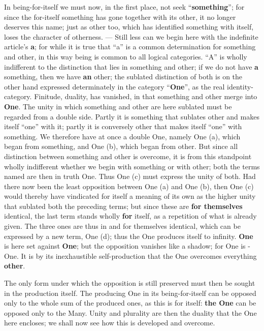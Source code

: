 \documentclass[12pt,a4paper,openany]{book}
\newcommand{\opage}[1]{\marginnote{\footnotesize\textit{[#1]}}}
\begin{document}
In being-for-itself we must now, in the first place, not
seek ``\textbf{something}''; for since the for-itself something
\setcounter{footnote}{0}%
\opage{16}has gone together with its other, it no longer deserves
this name; just as other too, which has
identified something with itself, loses the character of otherness.
--- Still less can we begin here with
the indefinite article's \textbf{a}; for while it is true that
``a'' is a common determination for something and other,
in this way being is common to all logical
categories. ``A'' is wholly indifferent to the distinction
that lies in something and other; if we do not have \textbf{a}
something, then we have \textbf{an} other; the sublated distinction of both
is on the other hand expressed determinately in the category ``\textbf{One}'',
as the real identity-category. Finitude,
duality, has vanished, in that something and other merge
into \textbf{One}. The unity in which something and other are here
sublated must be regarded from a double side. Partly
it is something that sublates other and makes itself ``one''
with it; partly it is conversely other that makes itself ``one''
with something. We therefore have at once a double One, namely
One (a), which began from something, and One (b), which
began from other. But since all distinction between something
and other is overcome, it is from this standpoint wholly indifferent whether we begin with something
or with other; both the terms named are then in truth One. Thus One (c) must express the unity of both.
Had there now been the least opposition between
One (a) and One (b), then One (c) would thereby have
vindicated for itself a meaning of its own as the higher unity
that sublated both the preceding terms; but since
these are \textbf{for themselves} identical, the last term stands wholly
\textbf{for} itself, as a repetition of what is already given.
The three ones are thus in and for themselves identical, which
can be expressed by a new term, One (d); thus
the One produces itself to infinity.
\setcounter{footnote}{0}%
\opage{17}\textbf{One} is here set against \textbf{One}; but the opposition
vanishes like a shadow; for One is - One. It
is by its inexhaustible self-production that the One overcomes
everything \textbf{other}.

The only form under which the opposition
is still preserved must then be sought in the production itself.
The producing One in its being-for-itself can
be opposed only to the whole sum of the produced ones,
as this is for itself: \textbf{the One} can be opposed only to
the Many. Unity and plurality are then the duality
that the One here encloses; we shall now see how
this is developed and overcome.
\end{document}
